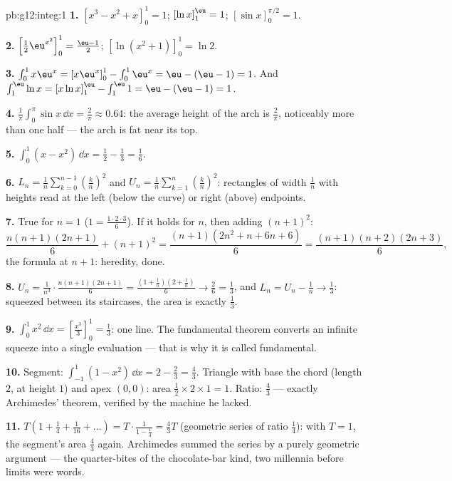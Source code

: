 \begin{solution}{pb:g12:integ:1}
\textbf{1.} $\left[x^3 - x^2 + x\right]_0^1 = 1$; \quad
$\left[\ln x\right]_1^{\eu} = 1$; \quad
$\left[\sin x\right]_0^{\pi/2} = 1$.

\textbf{2.} $\left[\frac12 \eu^{x^2}\right]_0^1 =
\frac{\eu - 1}{2}$; \quad
$\left[\ln(x^2 + 1)\right]_0^1 = \ln 2$.

\textbf{3.} $\int_0^1 x\eu^x = \left[x\eu^x\right]_0^1 -
\int_0^1 \eu^x = \eu - (\eu - 1) = 1$. And
$\int_1^{\eu} \ln x = \left[x\ln x\right]_1^{\eu} -
\int_1^{\eu} 1 = \eu - (\eu - 1) = 1$.

\textbf{4.} $\frac{1}{\pi}\int_0^\pi \sin x\,\dd x =
\frac{2}{\pi} \approx 0.64$: the average height of the 
arch is $\frac2\pi$, noticeably more than one half --- the
arch is fat near its top.

\textbf{5.} $\int_0^1 (x - x^2)\,\dd x = \frac12 - \frac13 =
\frac16$.

\textbf{6.} $L_n = \frac1n \sum_{k=0}^{n-1}
\left(\frac kn\right)^2$ and
$U_n = \frac1n \sum_{k=1}^{n} \left(\frac kn\right)^2$:
rectangles of width $\frac1n$ with heights read at the left
(below the curve) or right (above) endpoints.

\textbf{7.} True for $n = 1$ ($1 = \frac{1 \cdot 2 \cdot
3}{6}$). If it holds for $n$, then adding $(n+1)^2$:
\[
\frac{n(n+1)(2n+1)}{6} + (n+1)^2
= \frac{(n+1)\left(2n^2 + n + 6n + 6\right)}{6}
= \frac{(n+1)(n+2)(2n+3)}{6},
\]
the formula at $n + 1$: heredity, done.

\textbf{8.} $U_n = \frac{1}{n^3} \cdot
\frac{n(n+1)(2n+1)}{6} = \frac{(1 + \frac1n)(2 + \frac1n)}{6}
\to \frac26 = \frac13$, and $L_n = U_n - \frac1n \to \frac13$:
squeezed between its staircases, the area is exactly
$\frac13$.

\textbf{9.} $\int_0^1 x^2\,\dd x =
\left[\frac{x^3}{3}\right]_0^1 = \frac13$: one line. The
fundamental theorem converts an infinite squeeze into a single
 evaluation --- that is why it is called
fundamental.

\textbf{10.} Segment: $\int_{-1}^{1}(1 - x^2)\,\dd x =
2 - \frac23 = \frac43$. Triangle with base the chord (length
$2$, at height $1$) and apex $(0,0)$: area
$\frac12 \times 2 \times 1 = 1$. Ratio: $\frac43$ --- exactly
Archimedes' theorem, verified by the machine he lacked.

\textbf{11.} $T\left(1 + \frac14 + \frac{1}{16} + \dots\right)
= T \cdot \frac{1}{1 - \frac14} = \frac43 T$ (geometric series
of ratio $\frac14$): with $T = 1$, the segment's area
$\frac43$ again. Archimedes summed the series by a purely
geometric argument --- the quarter-bites of the chocolate-bar
kind, two millennia before limits were words.


\end{solution}
